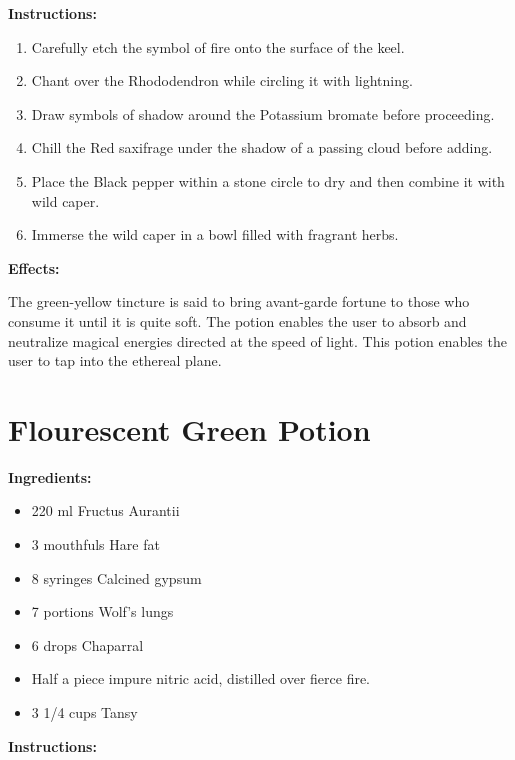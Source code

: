 \documentclass{article}
\begin{document}
\textbf{Instructions:}

\begin{enumerate}
  \item Carefully etch the symbol of fire onto the surface of the keel.
  \item Chant over the Rhododendron while circling it with lightning.
  \item Draw symbols of shadow around the Potassium bromate before proceeding.
  \item Chill the Red saxifrage under the shadow of a passing cloud before adding.
  \item Place the Black pepper within a stone circle to dry and then combine it with wild caper.
  \item Immerse the wild caper in a bowl filled with fragrant herbs.
\end{enumerate}

\textbf{Effects:}

The green-yellow tincture is said to bring avant-garde fortune to those who consume it until it is quite soft. The potion enables the user to absorb and neutralize magical energies directed at the speed of light. This potion enables the user to tap into the ethereal plane.

\newpage
\section*{Flourescent Green Potion}

\textbf{Ingredients:}

\begin{itemize}
  \item 220 ml Fructus Aurantii
  \item 3 mouthfuls Hare fat
  \item 8 syringes Calcined gypsum
  \item 7 portions Wolf's lungs
  \item 6 drops Chaparral
  \item Half a piece impure nitric acid, distilled over fierce fire.
  \item 3 1/4 cups Tansy
\end{itemize}

\textbf{Instructions:}
\end{document}
